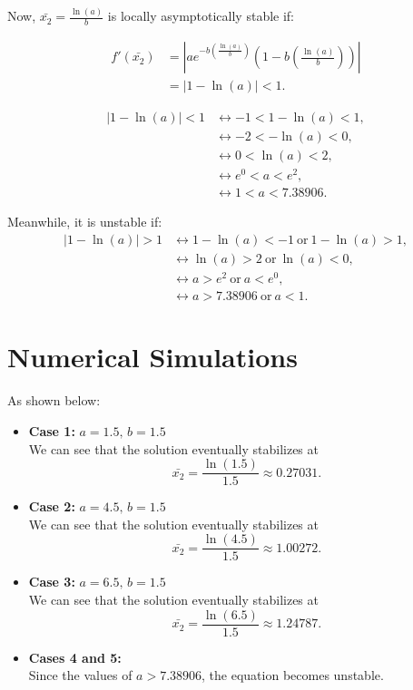 \documentclass [a4paper]{article}
\begin{document}
Now, \(\bar{x_2} = \frac{\ln({a})}{b}\) is locally asymptotically stable if:

\begin{align*}
    f'(\bar{x_2}) &= \left| ae^{-b\left(\frac{\ln(a)}{b}\right)} \left(1 - b\left(\frac{\ln(a)}{b}\right)\right) \right| \\
    &= \left| 1 - \ln(a) \right| < 1.
\end{align*}

\begin{align*}
    \left| 1 - \ln(a) \right| < 1 &\leftrightarrow 
    -1 < 1 - \ln(a) < 1, \\
    &\leftrightarrow -2 < -\ln(a) < 0, \\
    &\leftrightarrow 0 < \ln(a) < 2, \\
    &\leftrightarrow e^0 < a < e^2, \\
    &\leftrightarrow 1 < a < 7.38906.
\end{align*}

Meanwhile, it is unstable if:
\begin{align*}
    \left| 1 - \ln(a) \right| > 1 &\leftrightarrow 
    1 - \ln(a) < -1 \ \text{or} \ 1 - \ln(a) > 1, \\
    &\leftrightarrow \ln(a) > 2 \ \text{or} \ \ln(a) < 0, \\
    &\leftrightarrow a > e^2 \ \text{or} \ a < e^0, \\
    &\leftrightarrow a > 7.38906 \ \text{or} \ a < 1.
\end{align*}
\newpage
\section{Numerical Simulations}
As shown below:

\begin{itemize}
    \item \textbf{Case 1:} \( a = 1.5, \, b = 1.5 \) \\
    We can see that the solution eventually stabilizes at 
    \[
    \bar{x_2} = \frac{\ln(1.5)}{1.5} \approx 0.27031.
    \]

    \item \textbf{Case 2:} \( a = 4.5, \, b = 1.5 \) \\
    We can see that the solution eventually stabilizes at 
    \[
    \bar{x_2} = \frac{\ln(4.5)}{1.5} \approx 1.00272.
    \]

    \item \textbf{Case 3:} \( a = 6.5, \, b = 1.5 \) \\
    We can see that the solution eventually stabilizes at 
    \[
    \bar{x_2} = \frac{\ln(6.5)}{1.5} \approx 1.24787.
    \]

    \item \textbf{Cases 4 and 5:} \\
    Since the values of \( a > 7.38906 \), the equation becomes unstable.
\end{itemize}
\end{document}
